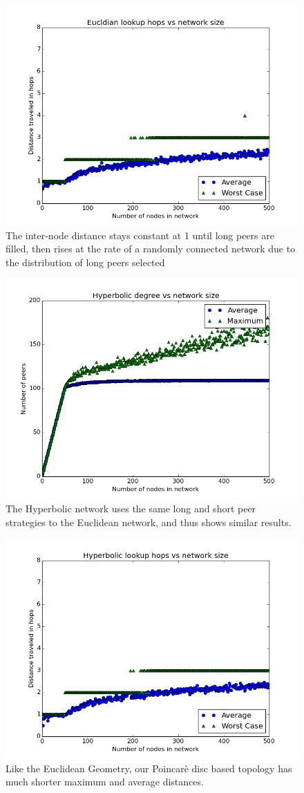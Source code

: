 \begin{figure}
\centering
\includegraphics[width=0.75\linewidth]{figs/EucldianDistance}
\caption{The inter-node distance stays constant at 1 until long peers are filled, then rises at the rate of a randomly connected network due to the distribution of long peers selected}
\label{fig:EucldianDistance}
\end{figure}

\begin{figure}
\centering
\includegraphics[width=0.75\linewidth]{figs/HyperbolicDegree}
\caption{The Hyperbolic network uses the same long and short peer strategies to the Euclidean network, and thus shows similar results.}
\label{fig:HyperbolicDegree}
\end{figure}
\begin{figure}
\centering
\includegraphics[width=0.75\linewidth]{figs/HyperbolicDistance}
\caption{Like the Euclidean Geometry, our Poincar\`{e} disc based topology has much shorter maximum and average distances.
}
\label{fig:HyperbolicDistance}
\end{figure}


